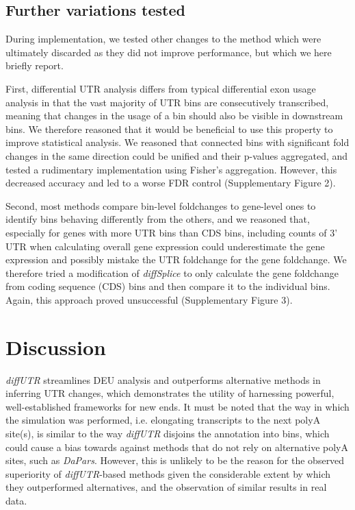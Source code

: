 \documentclass{bmcart}
\begin{document}
\subsection*{Further variations tested}

During implementation, we tested other changes to the method which were ultimately discarded as they did not improve performance, but which we here briefly report.

First, differential UTR analysis differs from typical differential exon usage analysis in that the vast majority of UTR bins are consecutively transcribed, meaning that changes in the usage of a bin should also be visible in downstream bins. We therefore reasoned that it would be beneficial to use this property to improve statistical analysis. We reasoned that connected bins with significant fold changes in the same direction could be unified and their p-values aggregated, and tested a rudimentary implementation using Fisher's aggregation. However, this decreased accuracy and led to a worse FDR control (Supplementary Figure 2).

Second, most methods compare bin-level foldchanges to gene-level ones to identify bins behaving differently from the others, and we reasoned that, especially for genes with more UTR bins than CDS bins, including counts of 3' UTR when calculating overall gene expression could underestimate the gene expression and possibly mistake the UTR foldchange for the gene foldchange. We therefore tried a modification of \textit{diffSplice} to only calculate the gene foldchange from coding sequence (CDS) bins and then compare it to the individual bins. Again, this approach proved unsuccessful (Supplementary Figure 3).

\section*{Discussion}

\textit{diffUTR} streamlines DEU analysis and outperforms alternative methods in inferring UTR changes, which demonstrates the utility of harnessing powerful, well-established frameworks for new ends. It must be noted that the way in which the simulation was performed, i.e. elongating transcripts to the next polyA site(s), is similar to the way \textit{diffUTR} disjoins the annotation into bins, which could cause a bias towards against methods that do not rely on alternative polyA sites, such as \textit{DaPars}. However, this is unlikely to be the reason for the observed superiority of \textit{diffUTR}-based methods given the considerable extent by which they outperformed alternatives, and the observation of similar results in real data.
\end{document}
